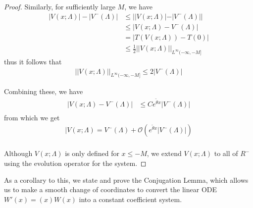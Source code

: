 \documentclass[thesis.tex]{subfiles}
\begin{document}
\begin{lemma}
\begin{proof}
Similarly, for sufficiently large $M$, we have
\begin{align*}
|V(x; \Lambda)| - |V^-(\Lambda)| &\leq | |V(x; \Lambda)| - |V^-(\Lambda)| | \\
&\leq |V(x; \Lambda) - V^-(\Lambda)| \\
&= |T(V(x; \Lambda)) - T(0)| \\
&\leq \frac{1}{2} ||V(x; \Lambda)||_{L^\infty(-\infty, -M]}
\end{align*}
thus it follows that
\begin{align*}
||V(x; \Lambda)||_{L^\infty(-\infty, -M]} \leq 2 |V^-(\Lambda)|
\end{align*}

Combining these, we have
\begin{align*}
|V(x; \Lambda) - V^-(\Lambda)| &\leq C e^{\tilde{\theta} x}|V^-(\Lambda)| \\
\end{align*}
from which we get
\begin{align*}
|V(x; \Lambda) = V^-(\Lambda) + \mathcal{O}( e^{\tilde{\theta} x}|V^-(\Lambda)| )\\
\end{align*}

Although $V(x; \Lambda)$ is only defined for $x \leq -M$, we extend $V(x; \Lambda)$ to all of $R^-$ using the evolution operator for the system.
\end{proof}
\end{lemma}

As a corollary to this, we state and prove the Conjugation Lemma, which allows us to make a smooth change of coordinates to convert the linear ODE $W'(x) = (x) W(x)$ into a constant coefficient system.
\end{document}
